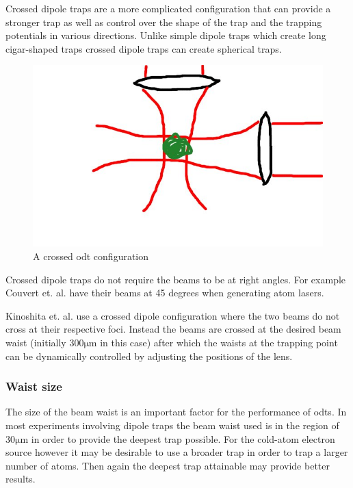Crossed dipole traps\cite{barrett_all-optical_2001, xiong_evaporative_2010, arnold_all-optical_2011, fu_bose-einstein_2011} are a more complicated configuration that can provide a stronger trap as well as control over the shape of the trap and the trapping potentials in various directions. Unlike simple dipole traps which create long cigar-shaped traps crossed dipole traps can create spherical traps.

\begin{figure}[h]
	\centering
	\includegraphics[scale=0.32]{figs/crosseddipoletrap.jpg}
	\caption[Title]{A crossed \gls{odt} configuration}
	\label{figs/MOT.pdf}
\end{figure}

Crossed dipole traps do not require the beams to be at right angles. For example Couvert et. al. \cite{couvert_quasi-monomode_2008} have their beams at 45 degrees when generating atom lasers.

Kinoshita et. al.\cite{kinoshita_all-optical_2005} use a crossed dipole configuration where the two beams do not cross at their respective foci. Instead the beams are crossed at the desired beam waist (initially $\mathrm{300\mu m}$ in this case) after which the waists at the trapping point can be dynamically controlled by adjusting the positions of the lens.


\subsubsection{Waist size}
The size of the beam waist is an important factor for the performance of \glspl{odt}. In most experiments involving dipole traps the beam waist used is in the region of $\mathrm{30\mu m}$ in order to provide the deepest trap possible. For the cold-atom electron source however it may be desirable to use a broader trap in order to trap a larger number of atoms. Then again the deepest trap attainable may provide better results.

